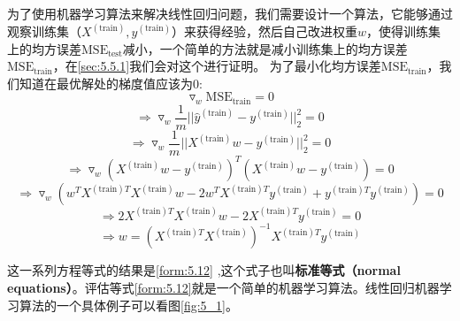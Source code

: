 为了使用机器学习算法来解决线性回归问题，我们需要设计一个算法，它能够通过观察训练集（$X^{(\mathrm{train})},y^{(\mathrm{train})}$）来获得经验，然后自己改进权重$w$，使得训练集上的均方误差$\mathrm{MSE}_{\mathrm{test}}$减小，一个简单的方法就是减小训练集上的均方误差$\mathrm{MSE}_{\mathrm{train}}$，在\ref{sec:5.5.1}我们会对这个进行证明。
为了最小化均方误差$\mathrm{MSE}_{\mathrm{train}}$，我们知道在最优解处的梯度值应该为$0$:
\begin{equation}
   \triangledown _w \mathrm{MSE}_{\mathrm{train}}=0
\end{equation}
\begin{equation}
   \Rightarrow \triangledown _w \frac{1}{m}||\hat{y}^{(\mathrm{train})}-y^{(\mathrm{train})}||_{2}^{2}=0
\end{equation}
\begin{equation}
   \Rightarrow \triangledown _w \frac{1}{m}||X^{(\mathrm{train})}w-y^{(\mathrm{train})}||_{2}^{2}=0
\end{equation}
\begin{equation}
   \Rightarrow \triangledown _w (X^{(\mathrm{train})}w-y^{(\mathrm{train})})^{T}(X^{(\mathrm{train})}w-y^{(\mathrm{train})})=0
\end{equation}
\begin{equation}
   \Rightarrow \triangledown _w(w^{T}X^{(\mathrm{train})T}X^{(\mathrm{train})}w-2w^{T}X^{(\mathrm{train})T}y^{(\mathrm{train})}+y^{(\mathrm{train})T}y^{(\mathrm{train})})=0
\end{equation}
\begin{equation}
 \Rightarrow 2X^{(\mathrm{train})T}X^{(\mathrm{train})}w-2X^{(\mathrm{train})T}y^{(\mathrm{train})}=0
\end{equation}
\begin{equation}
  \Rightarrow w=(X^{(\mathrm{train})T}X^{(\mathrm{train})})^{-1}X^{(\mathrm{train})T}y^{(\mathrm{train})}
  \label{form:5.12}
\end{equation}

这一系列方程等式的结果是\ref{form:5.12}  ,这个式子也叫\textbf{标准等式（normal equations）}。评估等式\ref{form:5.12}就是一个简单的机器学习算法。线性回归机器学习算法的一个具体例子可以看图\ref{fig:5_1}。

